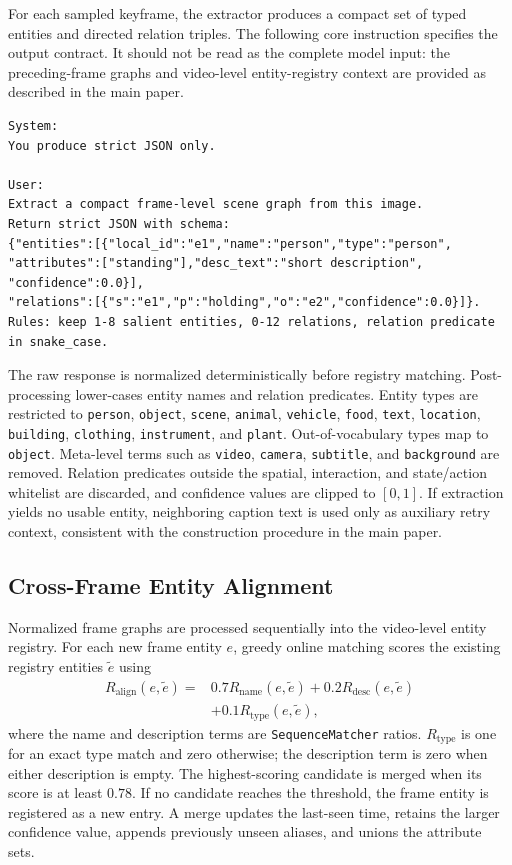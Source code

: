 For each sampled keyframe, the extractor produces a compact set of typed entities and directed relation triples.
The following core instruction specifies the output contract.
It should not be read as the complete model input: the preceding-frame graphs and video-level entity-registry context are provided as described in the main paper.

\begin{lstlisting}
System:
You produce strict JSON only.

User:
Extract a compact frame-level scene graph from this image.
Return strict JSON with schema:
{"entities":[{"local_id":"e1","name":"person","type":"person",
"attributes":["standing"],"desc_text":"short description",
"confidence":0.0}],
"relations":[{"s":"e1","p":"holding","o":"e2","confidence":0.0}]}.
Rules: keep 1-8 salient entities, 0-12 relations, relation predicate in snake_case.
\end{lstlisting}

The raw response is normalized deterministically before registry matching.
Post-processing lower-cases entity names and relation predicates.
Entity types are restricted to \texttt{person}, \texttt{object}, \texttt{scene}, \texttt{animal}, \texttt{vehicle}, \texttt{food}, \texttt{text}, \texttt{location}, \texttt{building}, \texttt{clothing}, \texttt{instrument}, and \texttt{plant}.
Out-of-vocabulary types map to \texttt{object}.
Meta-level terms such as \texttt{video}, \texttt{camera}, \texttt{subtitle}, and \texttt{background} are removed.
Relation predicates outside the spatial, interaction, and state/action whitelist are discarded, and confidence values are clipped to $[0,1]$.
If extraction yields no usable entity, neighboring caption text is used only as auxiliary retry context, consistent with the construction procedure in the main paper.

\subsection{Cross-Frame Entity Alignment}

Normalized frame graphs are processed sequentially into the video-level entity registry.
For each new frame entity $e$, greedy online matching scores the existing registry entities $\tilde e$ using
\begin{equation}
  \begin{split}
  R_{\mathrm{align}}(e,\tilde e)
  ={}&0.7R_{\mathrm{name}}(e,\tilde e)
  +0.2R_{\mathrm{desc}}(e,\tilde e)\\
  &+0.1R_{\mathrm{type}}(e,\tilde e),
  \end{split}
  \label{eq:supp-alignment}
\end{equation}
where the name and description terms are \texttt{SequenceMatcher} ratios.
$R_{\mathrm{type}}$ is one for an exact type match and zero otherwise; the description term is zero when either description is empty.
The highest-scoring candidate is merged when its score is at least $0.78$.
If no candidate reaches the threshold, the frame entity is registered as a new entry.
A merge updates the last-seen time, retains the larger confidence value, appends previously unseen aliases, and unions the attribute sets.

